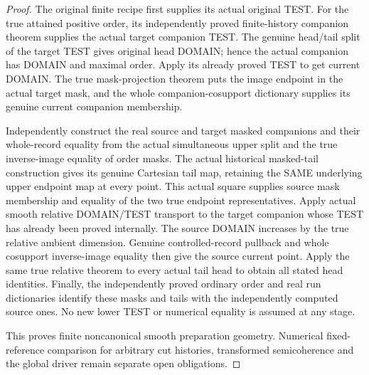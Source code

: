 \begin{proof}
The original finite recipe first supplies its actual original TEST. For
the true attained positive order, its independently proved finite-history
companion theorem supplies the actual target companion TEST. The genuine
head/tail split of the target TEST gives original head DOMAIN; hence the
actual companion has DOMAIN and maximal order. Apply its already proved
TEST to get current DOMAIN. The true mask-projection theorem puts the
image endpoint in the actual target mask, and the whole companion-cosupport
dictionary supplies its genuine current companion membership.

Independently construct the real source and target masked companions and
their whole-record equality from the actual simultaneous upper split and
the true inverse-image equality of order masks. The actual historical
masked-tail construction gives its genuine Cartesian tail map, retaining
the SAME underlying upper endpoint map at every point. This actual square
supplies source mask membership and equality of the two true endpoint
representatives. Apply actual smooth relative DOMAIN/TEST transport to
the target companion whose TEST has already been proved internally. The
source DOMAIN increases by the true relative ambient dimension. Genuine
controlled-record pullback and whole cosupport inverse-image equality
then give the source current point. Apply the same true relative theorem
to every actual tail head to obtain all stated head identities. Finally,
the independently proved ordinary order and real run dictionaries identify
these masks and tails with the independently computed source ones.
No new lower TEST or numerical equality is assumed at any stage.

This proves finite noncanonical smooth preparation geometry. Numerical
fixed-reference comparison for arbitrary cut histories, transformed
semicoherence and the global driver remain separate open obligations.
\end{proof}
